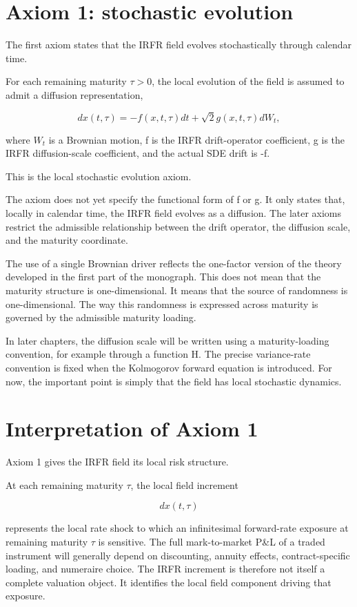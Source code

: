 \documentclass[11pt,oneside]{book}
\begin{document}
\section{Axiom 1: stochastic
evolution}\label{axiom-1-stochastic-evolution}

The first axiom states that the IRFR field evolves stochastically
through calendar time.

For each remaining maturity $\tau>0$, the local evolution of the
field is assumed to admit a diffusion representation,

\[
dx(t,\tau) = -f(x,t,\tau)dt + \sqrt{2} g(x,t,\tau)dW_t,
\]

where $W_t$ is a Brownian motion, f is the IRFR drift-operator
coefficient, g is the IRFR diffusion-scale coefficient, and the actual
SDE drift is -f.

This is the local stochastic evolution axiom.

The axiom does not yet specify the functional form of f or g. It only
states that, locally in calendar time, the IRFR field evolves as a
diffusion. The later axioms restrict the admissible relationship between
the drift operator, the diffusion scale, and the maturity coordinate.

The use of a single Brownian driver reflects the one-factor version of
the theory developed in the first part of the monograph. This does not
mean that the maturity structure is one-dimensional. It means that the
source of randomness is one-dimensional. The way this randomness is
expressed across maturity is governed by the admissible maturity
loading.

In later chapters, the diffusion scale will be written using a
maturity-loading convention, for example through a function H. The
precise variance-rate convention is fixed when the Kolmogorov forward
equation is introduced. For now, the important point is simply that the
field has local stochastic dynamics.

\section{Interpretation of Axiom 1}\label{interpretation-of-axiom-1}

Axiom 1 gives the IRFR field its local risk structure.

At each remaining maturity $\tau$, the local field increment

\[
dx(t,\tau)
\]

represents the local rate shock to which an infinitesimal forward-rate
exposure at remaining maturity $\tau$ is sensitive. The full mark-to-market
P\&L of a traded instrument will generally depend on discounting,
annuity effects, contract-specific loading, and numeraire choice. The
IRFR increment is therefore not itself a complete valuation object. It
identifies the local field component driving that exposure.
\end{document}

